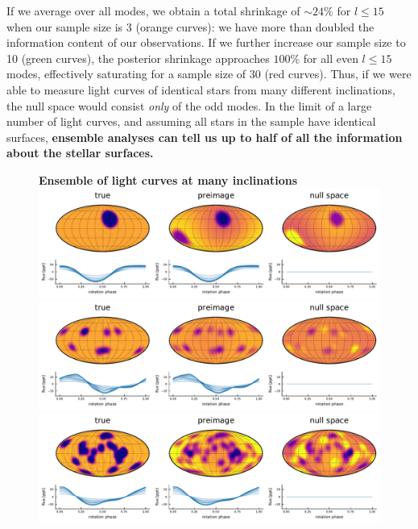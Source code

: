 \documentclass[modern]{aastex62}
\begin{document}
If we average over all modes, we obtain a total shrinkage of $\sim 24\%$
for $l\leq15$ when our sample size is 3 (orange curves): we have more than doubled the
information content of our observations. If we further increase our sample size
to 10 (green curves), the posterior shrinkage approaches $100\%$ for all even $l\leq15$
modes, effectively saturating for a sample size of 30 (red curves).
Thus, if we were able to measure light curves of identical stars
from many different inclinations, the null space would consist \emph{only}
of the odd modes. In the limit of a large number of light curves,
and assuming all stars in the sample have identical surfaces,
\textbf{ensemble analyses can tell us up to
    half of all the information about the stellar surfaces.}

\begin{figure}[p!]
    \begin{centering}
        \textbf{Ensemble of light curves at many inclinations}
        \\[1em]
        \includegraphics[width=\linewidth]{figures/nullspace_preimage_a.pdf}
        \\[1em]
        \includegraphics[width=\linewidth]{figures/nullspace_preimage_b.pdf}
        \\[1em]
        \includegraphics[width=\linewidth]{figures/nullspace_preimage_c.pdf}

\end{centering}
\end{figure}
\end{document}
